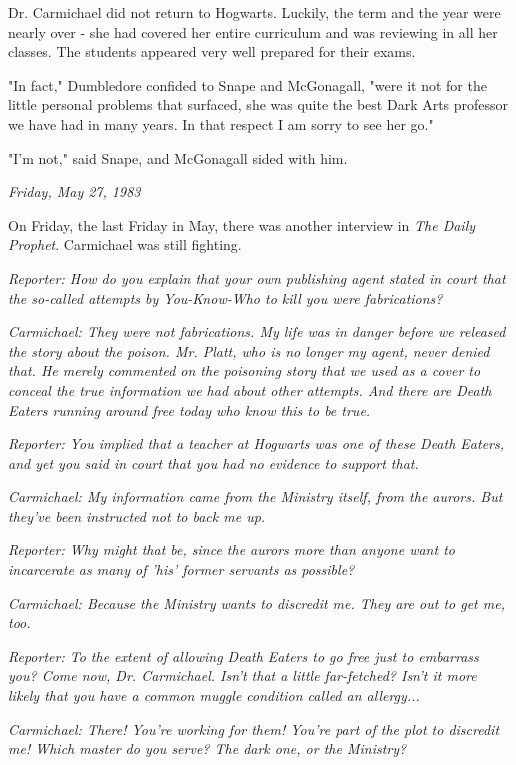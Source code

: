 \documentclass[a4paper,11pt]{article}
\begin{document}
Dr. Carmichael did not return to Hogwarts. Luckily, the term and the year were nearly over - she had covered her entire curriculum and was reviewing in all her classes. The students appeared very well prepared for their exams.

"In fact," Dumbledore confided to Snape and McGonagall, "were it not for the little personal problems that surfaced, she was quite the best Dark Arts professor we have had in many years. In that respect I am sorry to see her go."

"I'm not," said Snape, and McGonagall sided with him.

\emph{Friday, May 27, 1983}

On Friday, the last Friday in May, there was another interview in \emph{The Daily Prophet}. Carmichael was still fighting.

\emph{Reporter: How do you explain that your own publishing agent stated in court that the so-called attempts by You-Know-Who to kill you were fabrications?}

\emph{Carmichael: They were not fabrications. My life was in danger before we released the story about the poison. Mr. Platt, who is no longer my agent, never denied that. He merely commented on the poisoning story that we used as a cover to conceal the true information we had about other attempts. And there are Death Eaters running around free today who know this to be true.}

\emph{Reporter: You implied that a teacher at Hogwarts was one of these Death Eaters, and yet you said in court that you had no evidence to support that.}

\emph{Carmichael: My information came from the Ministry itself, from the aurors. But they've been instructed not to back me up.}

\emph{Reporter: Why might that be, since the aurors more than anyone want to incarcerate as many of 'his' former servants as possible?}

\emph{Carmichael: Because the Ministry wants to discredit me. They are out to get me, too.}

\emph{Reporter: To the extent of allowing Death Eaters to go free just to embarrass you? Come now, Dr. Carmichael. Isn't that a little far-fetched? Isn't it more likely that you have a common muggle condition called an allergy...}

\emph{Carmichael: There! You're working for them! You're part of the plot to discredit me! Which master do you serve? The dark one, or the Ministry?}
\end{document}
